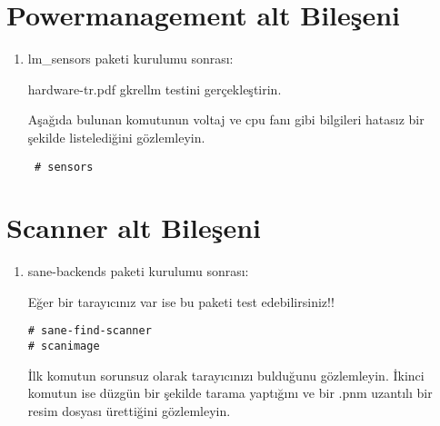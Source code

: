 \documentclass[a4paper,10pt]{article}
\begin{document}
\section{Powermanagement alt Bileşeni}
\begin{enumerate}
 \item lm_sensors paketi kurulumu sonrası:

hardware-tr.pdf gkrellm testini gerçekleştirin.

Aşağıda bulunan komutunun voltaj ve cpu fanı gibi bilgileri hatasız bir şekilde listelediğini gözlemleyin.
\begin{verbatim}
 # sensors 
\end{verbatim}

\end{enumerate}

\section{Scanner alt Bileşeni}
\begin{enumerate}
\item sane-backends paketi kurulumu sonrası:

Eğer bir tarayıcınız var ise bu paketi test edebilirsiniz!!
\begin{verbatim}
# sane-find-scanner
# scanimage 
\end{verbatim}

İlk komutun sorunsuz olarak tarayıcınızı bulduğunu gözlemleyin.
İkinci komutun ise düzgün bir şekilde tarama yaptığını ve bir .pnm uzantılı bir resim dosyası ürettiğini gözlemleyin.
\end{enumerate}
\end{document}

